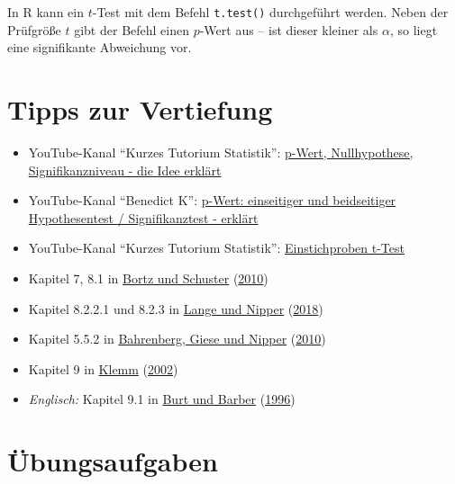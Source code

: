 \documentclass[
  11pt,
  ngerman,
  a4paper,
]{report}
\providecommand{\tightlist}{%
  \setlength{\itemsep}{0pt}\setlength{\parskip}{0pt}}
\newenvironment{rtip}{
  \medskip
  \begin{tcolorbox}[colframe=purple,colback=light_gray,title=Softwarehinweis]
}{
  \end{tcolorbox}
  \medskip
}
\begin{document}
\begin{rtip}
In R kann ein $t$-Test mit dem Befehl \verb|t.test()| durchgeführt werden. Neben der Prüfgröße $t$ gibt der Befehl einen $p$-Wert aus -- ist dieser kleiner als $\alpha$, so liegt eine signifikante Abweichung vor.
\end{rtip}

\hypertarget{tipps-zur-vertiefung-4}{%
\section*{Tipps zur Vertiefung}\label{tipps-zur-vertiefung-4}}

\begin{itemize}
\tightlist
\item
  YouTube-Kanal \enquote{Kurzes Tutorium Statistik}: \href{https://www.youtube.com/watch?v=gSyGVDMcg-U}{p-Wert, Nullhypothese, Signifikanzniveau - die Idee erklärt}
\item
  YouTube-Kanal \enquote{Benedict K}: \href{https://www.youtube.com/watch?v=sNlxShUM4io}{p-Wert: einseitiger und beidseitiger Hypothesentest / Signifikanztest - erklärt}
\item
  YouTube-Kanal \enquote{Kurzes Tutorium Statistik}: \href{https://www.youtube.com/watch?v=rbYg5IsOYaM}{Einstichproben t-Test}
\item
  Kapitel 7, 8.1 in \protect\hyperlink{ref-bortz}{Bortz und Schuster} (\protect\hyperlink{ref-bortz}{2010})
\item
  Kapitel 8.2.2.1 und 8.2.3 in \protect\hyperlink{ref-delange}{Lange und Nipper} (\protect\hyperlink{ref-delange}{2018})
\item
  Kapitel 5.5.2 in \protect\hyperlink{ref-bahrenberg}{Bahrenberg, Giese und Nipper} (\protect\hyperlink{ref-bahrenberg}{2010})
\item
  Kapitel 9 in \protect\hyperlink{ref-klemm}{Klemm} (\protect\hyperlink{ref-klemm}{2002})
\item
  \emph{Englisch:} Kapitel 9.1 in \protect\hyperlink{ref-burt}{Burt und Barber} (\protect\hyperlink{ref-burt}{1996})
\end{itemize}

\hypertarget{uxfcbungsaufgaben-4}{%
\section*{Übungsaufgaben}\label{uxfcbungsaufgaben-4}}
\end{document}
